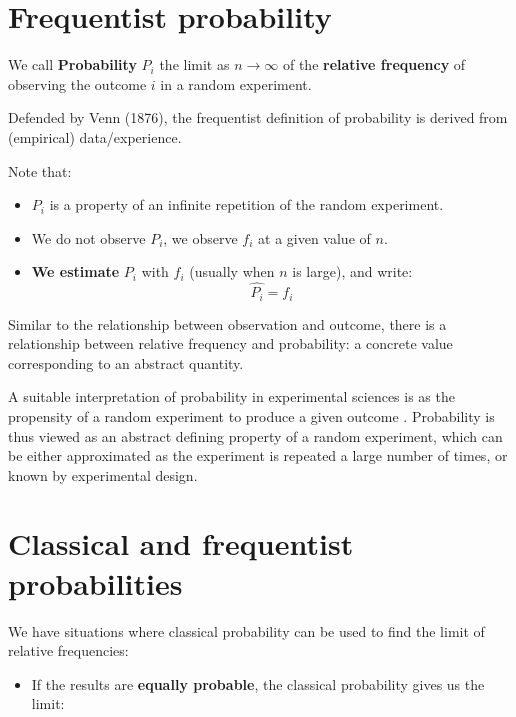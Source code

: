 \documentclass[
]{book}
\providecommand{\tightlist}{%
  \setlength{\itemsep}{0pt}\setlength{\parskip}{0pt}}
\begin{document}
\hypertarget{frequentist-probability}{%
\section{Frequentist probability}\label{frequentist-probability}}

We call \textbf{Probability} \(P_i\) the limit as \(n \rightarrow \infty\) of the \textbf{relative frequency} of observing the outcome \(i\) in a random experiment.

Defended by Venn (1876), the frequentist definition of probability is derived from (empirical) data/experience.

Note that:

\begin{itemize}
\tightlist
\item
  \(P_i\) is a property of an infinite repetition of the random experiment.
\item
  We do not observe \(P_i\), we observe \(f_i\) at a given value of \(n\).
\item
  \textbf{We estimate} \(P_i\) with \(f_i\) (usually when \(n\) is large), and write: \[\hat {P_ i}= f_i\]
\end{itemize}

Similar to the relationship between observation and outcome, there is a relationship between relative frequency and probability: a concrete value corresponding to an abstract quantity.

A suitable interpretation of probability in experimental sciences is as the propensity of a random experiment to produce a given outcome \citep{popper2002logic}. Probability is thus viewed as an abstract defining property of a random experiment, which can be either approximated as the experiment is repeated a large number of times, or known by experimental design.

\hypertarget{classical-and-frequentist-probabilities}{%
\section{Classical and frequentist probabilities}\label{classical-and-frequentist-probabilities}}

We have situations where classical probability can be used to find the limit of relative frequencies:

\begin{itemize}
\tightlist
\item
  If the results are \textbf{equally probable}, the classical probability gives us the limit:
\end{itemize}
\end{document}
